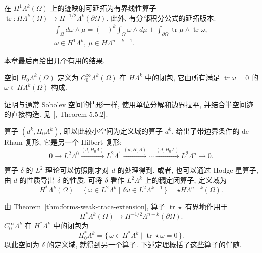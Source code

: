 \begin{Theorem}\label{thm:forms-weak-trace-extension}
在 $H^1\Lambda^k(\Omega)$ 上的迹映射可延拓为有界线性算子 $\operatorname{tr}:H\Lambda^k(\Omega)\to H^{-1/2}\Lambda^k(\partial\Omega)$. 此外, 有分部积分公式的延拓版本:
\begin{equation}\label{eq:forms-extended-integration-by-parts}
\begin{gathered}
\int_\Omega d\omega\wedge\mu=(-)^k\int_\Omega\omega\wedge d\mu+\int_{\partial\Omega}\operatorname{tr}\mu\wedge\operatorname{tr}\omega,\\
\omega\in H^1\Lambda^k,\ \mu\in H\Lambda^{n-k-1}.
\end{gathered}
\end{equation}
\end{Theorem}

本章最后再给出几个有用的结果.

\begin{Theorem}\label{thm:forms-zero-trace-characterization}
空间 $ H_{0}\Lambda^k(\Omega)$ 定义为 $C_0^\infty\Lambda^k(\Omega)$ 在 $H\Lambda^k$ 中的闭包, 它由所有满足 $\operatorname{tr}\omega=0$ 的 $\omega\in H\Lambda^k(\Omega)$ 构成.
\end{Theorem}

\begin{Proof}
证明与通常 Sobolev 空间的情形一样, 使用单位分解和边界拉平, 并结合半空间迹的直接构造. 见 [, Theorem 5.5.2].
\end{Proof}

算子 $(d^k, H_{0}\Lambda^k)$, 即以此较小空间为定义域的算子 $d^k$, 给出了带边界条件的 de Rham 复形, 它是另一个 Hilbert 复形:
\begin{equation}\label{eq:boundary-manifold-de-rham-complex}
0\to L^2\Lambda^0\xrightarrow{(d, H_{0}\Lambda)}L^2\Lambda^1\xrightarrow{(d, H_{0}\Lambda)}\cdots\xrightarrow{(d, H_{0}\Lambda)}L^2\Lambda^n\to0.
\end{equation}

算子 $\delta$ 的 $L^2$ 理论可以仿照刚才对 $d$ 的处理得到. 或者, 也可以通过 Hodge 星算子, 由 $d$ 的性质导出 $\delta$ 的性质. 可将 $\delta$ 看作 $L^2\Lambda^k$ 上的稠定闭算子, 定义域为
\[
H^*\Lambda^k(\Omega)=\{\,\omega\in L^2\Lambda^k\mid\delta\omega\in L^2\Lambda^{k-1}\,\}=\star H\Lambda^{n-k}(\Omega).
\]

由 Theorem~\ref{thm:forms-weak-trace-extension}, 算子 $\operatorname{tr}\star$ 有界地作用于
\[
H^*\Lambda^k(\Omega)\to H^{-1/2}\Lambda^{n-k}(\partial\Omega).
\]
$C_0^\infty\Lambda^k$ 在 $H^*\Lambda^k$ 中的闭包为
\[
 H_{0}^*\Lambda^k=\{\,\omega\in H^*\Lambda^k\mid\operatorname{tr}\star\omega=0\,\}.
\]
以此空间为 $\delta$ 的定义域, 就得到另一个算子. 下述定理概括了这些算子的伴随.

